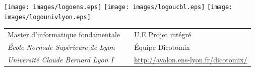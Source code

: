 \documentclass[11pt,a4paper]{article}
\theoremstyle{plain}
\theoremstyle{definition}
\begin{document}
\setlength{\parindent}{0pt}

\thispagestyle{empty}

\texttt{[image: images/logoens.eps]} \hfill \texttt{[image: images/logoucbl.eps]} \hfill \texttt{[image: images/logounivlyon.eps]}

\vspace{0.5cm}

\begin{tabularx}{\textwidth}{@{} l X l @{} }
{\sc Master d'informatique fondamentale} & & U.E Projet intégré\\
{\it École Normale Supérieure de Lyon} & & Équipe Dicotomix\ \\
{\it Université Claude Bernard Lyon I} & & \url{http://avalon.ens-lyon.fr/dicotomix/}
\end{tabularx}
\end{document}
